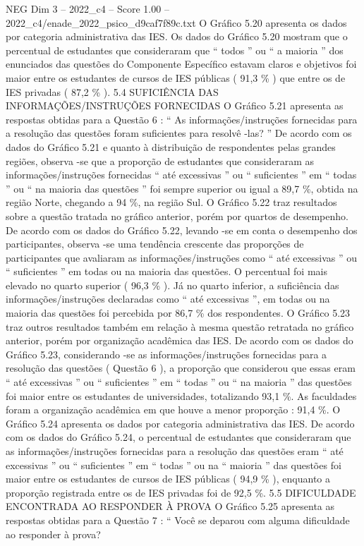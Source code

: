 \begin{textsample}{NEG Dim 3 – 2022\_c4 – Score 1.00 – 2022\_c4/enade\_2022\_psico\_d9caf7f89c.txt}
O Gráfico 5.20 apresenta os dados por categoria administrativa das IES.
Os dados do Gráfico 5.20 mostram que o percentual de estudantes que consideraram que “ todos ” ou “ a maioria ” dos enunciados das questões do Componente Específico estavam claros e objetivos foi maior entre os estudantes de cursos de IES públicas ( 91,3 \% ) que entre os de IES privadas ( 87,2 \% ). 5.4 SUFICIÊNCIA DAS INFORMAÇÕES/INSTRUÇÕES FORNECIDAS O Gráfico 5.21 apresenta as respostas obtidas para a Questão 6 : “ As informações/instruções fornecidas para a resolução das questões foram suficientes para resolvê -las? ” De acordo com os dados do Gráfico 5.21 e quanto à distribuição de respondentes pelas grandes regiões, observa -se que a proporção de estudantes que consideraram as informações/instruções fornecidas “ até excessivas ” ou “ suficientes ” em “ todas ” ou “ na maioria das questões ” foi sempre superior ou igual a 89,7 \%, obtida na região Norte, chegando a 94 \%, na região Sul.
O Gráfico 5.22 traz resultados sobre a questão tratada no gráfico anterior, porém por quartos de desempenho.
De acordo com os dados do Gráfico 5.22, levando -se em conta o desempenho dos participantes, observa -se uma tendência crescente das proporções de participantes que avaliaram as informações/instruções como “ até excessivas ” ou “ suficientes ” em todas ou na maioria das questões.
O percentual foi mais elevado no quarto superior ( 96,3 \% ).
Já no quarto inferior, a suficiência das informações/instruções declaradas como “ até excessivas ”, em todas ou na maioria das questões foi percebida por 86,7 \% dos respondentes.
O Gráfico 5.23 traz outros resultados também em relação à mesma questão retratada no gráfico anterior, porém por organização acadêmica das IES.
De acordo com os dados do Gráfico 5.23, considerando -se as informações/instruções fornecidas para a resolução das questões ( Questão 6 ), a proporção que considerou que essas eram “ até excessivas ” ou “ suficientes ” em “ todas ” ou “ na maioria ” das questões foi maior entre os estudantes de universidades, totalizando 93,1 \%.
As faculdades foram a organização acadêmica em que houve a menor proporção : 91,4 \%.
O Gráfico 5.24 apresenta os dados por categoria administrativa das IES.
De acordo com os dados do Gráfico 5.24, o percentual de estudantes que consideraram que as informações/instruções fornecidas para a resolução das questões eram “ até excessivas ” ou “ suficientes ” em “ todas ” ou na “ maioria ” das questões foi maior entre os estudantes de cursos de IES públicas ( 94,9 \% ), enquanto a proporção registrada entre os de IES privadas foi de 92,5 \%. 5.5 DIFICULDADE ENCONTRADA AO RESPONDER À PROVA O Gráfico 5.25 apresenta as respostas obtidas para a Questão 7 : “ Você se deparou com alguma dificuldade ao responder à prova?

\end{textsample}
